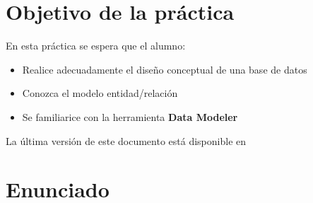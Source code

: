 

\renewcommand{\hmwkTitle}{Diseño de base de datos con \textbf{Data Modeler}}

\renewcommand{\hmwkClass}{Gestión de Base de Datos}




\primerapagina


\section{Objetivo de la práctica} En esta práctica se espera que el alumno:
\begin{itemize}
\item Realice adecuadamente el diseño conceptual de una base de datos
\item Conozca el modelo entidad/relación
\item Se familiarice con la herramienta \textbf{Data Modeler}
  
\end{itemize}

La última versión de este documento está disponible en 


\section{Enunciado}

